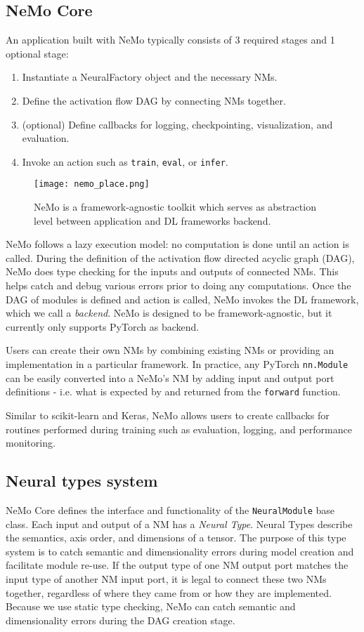 \documentclass{article}
\begin{document}
\subsection{NeMo Core}\label{nemo_core}
An application built with NeMo typically consists of 3 required stages and 1 optional stage:
\begin{enumerate}
  \item Instantiate a NeuralFactory object and the necessary NMs. 
  \item Define the activation flow DAG by connecting NMs together.
  \item (optional) Define callbacks for logging, checkpointing, visualization, and evaluation.
  \item Invoke an action such as \texttt{train}, \texttt{eval}, or \texttt{infer}.
\end{enumerate}

\begin{wrapfigure}{r}{0.4\textwidth}
\texttt{[image: nemo\_place.png]}
\caption{NeMo is a framework-agnostic toolkit which serves as abstraction level between application and DL frameworks backend.}
\label{nemo_place}
\end{wrapfigure}

NeMo follows a lazy execution model: no computation is done until an action is called. During the definition of the activation flow directed acyclic graph (DAG), NeMo does type checking for the inputs and outputs of connected NMs. This helps catch and debug various errors prior to doing any computations. Once the DAG of modules is defined and action is called, 
NeMo invokes the DL framework, which we call a \textit{backend}.
NeMo is designed to be framework-agnostic, but it currently only supports PyTorch as backend.



Users can create their own NMs by combining existing NMs or providing an implementation in a particular framework. In practice, any PyTorch \texttt{nn.Module} can be easily converted into a NeMo's NM by adding input and output port definitions - i.e. what is expected by and returned from the \texttt{forward} function.

Similar to scikit-learn and Keras, NeMo allows users to create callbacks for routines performed during training such as evaluation, logging, and performance monitoring.

\subsection{Neural types system}\label{types}
NeMo Core defines the interface and functionality of the \texttt{NeuralModule} base class. Each input and output of a NM has a \textit{Neural Type}. Neural Types describe the semantics, axis order, and dimensions of a tensor. The purpose of this type system is to catch semantic and dimensionality errors during model creation and facilitate module re-use. If the output type of one NM output port matches the input type of another NM input port, it is legal to connect these two NMs together, regardless of where they came from or how they are implemented. Because we use static type checking, NeMo can catch semantic and dimensionality errors during the DAG creation stage. 
\end{document}
